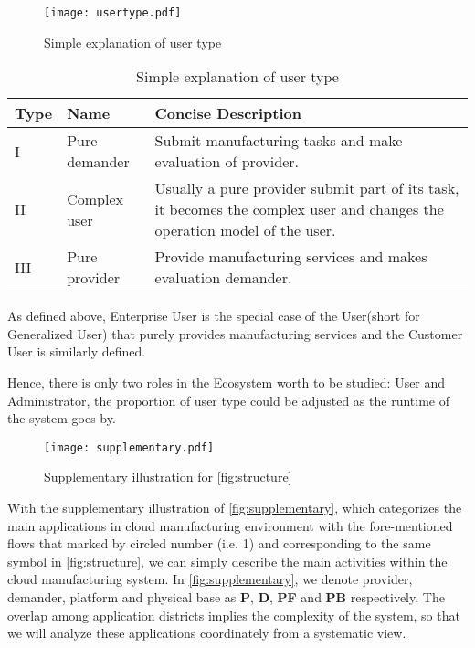 \begin{figure}[htbp]
	\centering
	\texttt{[image: usertype.pdf]}
	\caption{Simple explanation of user type}
	\label{fig:usertype}
\end{figure}

\begin{table}[htbp]
	\caption{Simple explanation of user type}
	\label{tab:usertype}
	\centering

	\begin{tabularx}{\textwidth}{llX}
	\toprule
	\textbf{Type} & \textbf{Name} &  \textbf{Concise Description}\\
	\midrule
	I			& Pure demander &  Submit manufacturing tasks and make evaluation of provider.\\
	II 			& Complex user 	&  Usually a pure provider submit part of its task, it becomes the complex user and changes the operation model of the user.\\
	III 		& Pure provider &  Provide manufacturing services and makes evaluation demander.\\
	\bottomrule
	\end{tabularx}
\end{table}

As defined above, Enterprise User is the special case of the User(short for Generalized User) that purely provides manufacturing services and the Customer User is similarly defined.

Hence, there is only two roles in the Ecosystem worth to be studied: User and Administrator, the proportion of user type could be adjusted as the runtime of the system goes by.

\begin{figure}[htbp]
\centering
\texttt{[image: supplementary.pdf]}
\caption{Supplementary illustration for \autoref{fig:structure}}
\label{fig:supplementary}
\end{figure}

With the supplementary illustration of \autoref{fig:supplementary}, which categorizes the main applications in cloud manufacturing environment with the fore-mentioned flows that marked by circled number (i.e. \textcircled{\small{1}}) and corresponding to the same symbol in \autoref{fig:structure}, we can simply describe the main activities within the cloud manufacturing system. In \autoref{fig:supplementary}, we denote provider, demander, platform and physical base as \textbf{P}, \textbf{D}, \textbf{PF} and \textbf{PB} respectively. The overlap among application districts implies the complexity of the system, so that we will analyze these applications coordinately from a systematic view.

